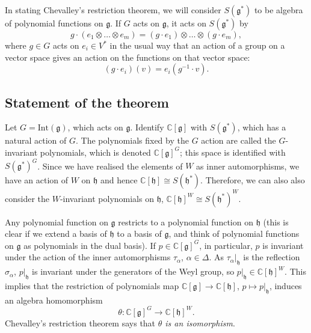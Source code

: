 \documentclass[12pt]{amsart}
\newcommand{\C}{\mathbb{C}}
\newcommand{\g}{\mathfrak{g}}
\newcommand{\h}{\mathfrak{h}}
\theoremstyle{remark}
\theoremstyle{remark}
\theoremstyle{remark}
\begin{document}
In stating Chevalley's restriction theorem, we will consider $S(\g^*)$ to be algebra of polynomial functions on $\g$.
If $G$ acts on $\g$, it acts on $S(\g^*)$ by
$$g \cdot (e_1 \otimes \ldots \otimes e_m) = (g\cdot e_1) \otimes \ldots \otimes (g \cdot e_m),$$
where $g \in G$ acts on $e_i \in V^*$ in the usual way that an action of a group on a vector space gives an action on the functions on that vector space:
$$(g\cdot e_i)(v) = e_i(g^{-1} \cdot v).$$

\subsection{Statement of the theorem}
Let $G = \mathrm{Int}(\g)$, which acts on $\g$.
Identify $\C[\g]$ with $S(\g^*)$, which has a natural action of $G$.
The polynomials fixed by the $G$ action are called the $G$-invariant polynomials, which is denoted $\C[\g]^G$; this space is identified with $S(\g^*)^G$.
Since we have realised the elements of $W$ as inner automorphisms, we have an action of $W$ on $\h$ and hence $\C[\h] \cong S(\h^*)$.
Therefore, we can also also consider the $W$-invariant polynomials on $\h$, $\C[\h]^W \cong S(\h^*)^W$.

Any polynomial function on $\g$ restricts to a polynomial function on $\h$ (this is clear if we extend a basis of $\h$ to a basis of $\g$, and think of polynomial functions on $\g$ as polynomials in the dual basis).
If $p \in \C[\g]^G$, in particular, $p$ is invariant under the action of the inner automorphisms $\tau_\alpha$, $\alpha \in \Delta$.
As $\left. \tau_\alpha \right|_\h$ is the reflection $\sigma_\alpha$, $\left. p \right|_\h$ is invariant under the generators of the Weyl group, so $\left. p \right|_\h \in \C[\h]^W$.
This implies that the restriction of polynomials map $\C[\g] \to \C[\h]$, $p \mapsto \left. p \right|_\h$, induces an algebra homomorphism
$$\theta: \C[\g]^G \to \C[\h]^W.$$
Chevalley's restriction theorem says that \emph{$\theta$ is an isomorphism}.
\end{document}
